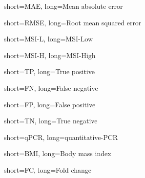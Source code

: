 {
    short=MAE,
    long=Mean absolute error
}

{
    short=RMSE,
    long=Root mean squared error
}

{
    short=MSI-L,
    long=MSI-Low
}

{
    short=MSI-H,
    long=MSI-High
}

{
    short=TP,
    long=True positive
}

{
    short=FN,
    long=False negative
}

{
    short=FP,
    long=False positive
}

{
    short=TN,
    long=True negative
}

{
    short=qPCR,
    long=quantitative-PCR
}

{
    short=BMI,
    long=Body mass index
}

{
    short=FC,
    long=Fold change
}

